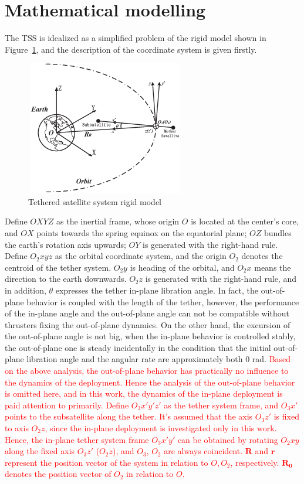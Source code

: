 \documentclass[3p]{elsarticle}
\theoremstyle{plain}
\begin{document}
\section{Mathematical modelling}\label{sec:mm}
The TSS is idealized as a simplified problem of the rigid model shown in Figure~\ref{fig:model}, and the description of the coordinate system is given firstly.
\begin{figure}
\centering
\includegraphics[width=6.94cm,height=5.87cm]{orbit_in_plane.eps}
\caption{Tethered satellite system rigid model}\label{fig:model}
\end{figure}
Define $OXYZ$ as the inertial frame, whose origin $O$ is located at the center's core, and $OX$ points towards the spring equinox on the equatorial plane; $OZ$ bundles the earth's rotation axis upwards; $OY$ is generated with the right-hand rule.
Define $O_2xyz$ as the orbital coordinate system, and the origin $O_2$ denotes the centroid of the tether system. $O_2y$ is heading of the orbital, and $O_2x$ means the direction to the earth downwards. $O_2z$ is generated with the right-hand rule, and in addition, $\theta$ expresses the tether in-plane libration angle. In fact, the out-of-plane behavior is coupled with the length of the tether, however, the performance of the in-plane angle and the  out-of-plane angle can not be compatible without thrusters fixing the out-of-plane dynamics\cite{Vadali1991Feedback}. On the other hand, the excursion of the out-of-plane angle is not big, when the in-plane behavior is controlled stably, the out-of-plane one is steady incidentally in the condition that the initial out-of-plane libration angle and the angular rate are approximately both $0$ rad. \textcolor{red}{Based on the above analysis, the out-of-plane behavior has practically no influence to the dynamics of the deployment. Hence the analysis of the out-of-plane behavior is omitted here, and in this work, the dynamics of the in-plane deployment is paid attention to primarily. Define $O_3x'y'z'$ as the tether system frame, and $O_3x'$ points to the subsatellite along the tether. It's assumed that the axis $O_3z'$ is fixed to axis $O_2z$, since the in-plane deployment is investigated only in this work. Hence, the in-plane tether system frame $O_3x'y'$ can be obtained by rotating $O_2xy$ along the fixed axis $O_3z'$ ($O_2z$), and $O_3$, $O_2$ are always coincident. $\bm{R}$ and $\bm{r}$ represent the position vector of the system in relation to $O,O_2$, respectively. $\bm{R_0}$ denotes the position vector of $O_2$ in relation to $O$.}\par
\end{document}
